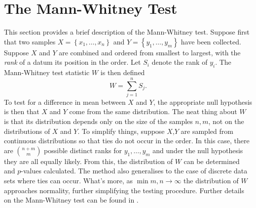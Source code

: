 \documentclass[12pt]{book}
\begin{document}
\section{The Mann-Whitney Test}
\label{Ap:Mann}
This section provides a brief description of the Mann-Whitney test. Suppose first that two samples $X=\left\{x_1,\ldots,x_n\right\}$ and $Y=\left\{y_1,\ldots,y_m\right\}$ have been collected. Suppose $X$ and $Y$ are combined and ordered from smallest to largest, with the \textit{rank} of a datum its position in the order. Let $S_i$ denote the rank of $y_i$. The Mann-Whitney test statistic $W$ is then defined 
\begin{equation}
W=\sum_{j=1}^n S_j.
\end{equation}
To test for a difference in mean between $X$ and $Y$, the appropriate null hypothesis is then that $X$ and $Y$ come from the same distribution. The neat thing about $W$ is that its distribution depends only on the size of the samples $n,m$, not on the distributions of $X$ and $Y$. To simplify things, suppose $X$,$Y$ are sampled from continuous distributions so that ties do not occur in the order. In this case, there are $\binom{n+m}{m}$ possible distinct ranks for $y_1,\ldots,y_m$ and under the null hypothesis they are all equally likely. From this, the distribution of $W$ can be determined and $p$-values calculated. The method also generalises to the case of discrete data sets where ties can occur. What's more, as $\min{m,n}\to\infty$ the distribution of $W$ approaches normality, further simplifying the testing procedure. Further details on the Mann-Whitney test can be found in \citep[p.122]{hollander14}.


\end{document}
